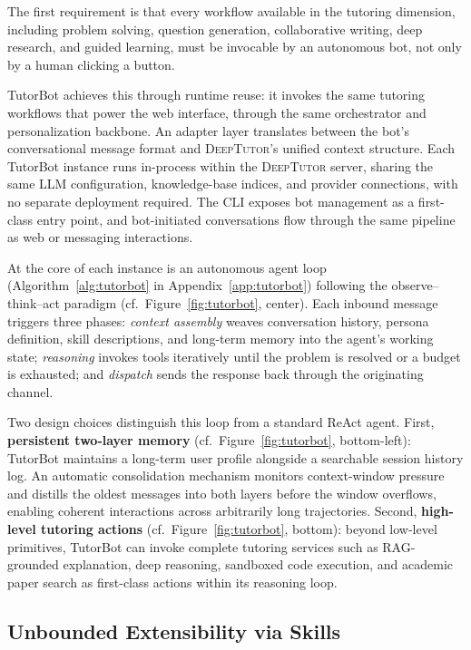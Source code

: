 The first requirement is that every workflow available in the tutoring dimension, including problem solving, question generation, collaborative writing, deep research, and guided learning, must be invocable by an autonomous bot, not only by a human clicking a button.

TutorBot achieves this through runtime reuse: it invokes the same tutoring workflows that power the web interface, through the same orchestrator and personalization backbone.
An adapter layer translates between the bot's conversational message format and \textsc{DeepTutor}'s unified context structure.
Each TutorBot instance runs in-process within the \textsc{DeepTutor} server, sharing the same LLM configuration, knowledge-base indices, and provider connections, with no separate deployment required.
The CLI exposes bot management as a first-class entry point, and bot-initiated conversations flow through the same pipeline as web or messaging interactions.

At the core of each instance is an autonomous agent loop (Algorithm~\ref{alg:tutorbot} in Appendix~\ref{app:tutorbot}) following the observe--think--act paradigm (cf.\ Figure~\ref{fig:tutorbot}, center).
Each inbound message triggers three phases: \emph{context assembly} weaves conversation history, persona definition, skill descriptions, and long-term memory into the agent's working state; \emph{reasoning} invokes tools iteratively until the problem is resolved or a budget is exhausted; and \emph{dispatch} sends the response back through the originating channel.

Two design choices distinguish this loop from a standard ReAct agent.
First, \textbf{persistent two-layer memory} (cf.\ Figure~\ref{fig:tutorbot}, bottom-left): TutorBot maintains a long-term user profile alongside a searchable session history log.
An automatic consolidation mechanism monitors context-window pressure and distills the oldest messages into both layers before the window overflows, enabling coherent interactions across arbitrarily long trajectories.
Second, \textbf{high-level tutoring actions} (cf.\ Figure~\ref{fig:tutorbot}, bottom): beyond low-level primitives, TutorBot can invoke complete tutoring services such as RAG-grounded explanation, deep reasoning, sandboxed code execution, and academic paper search as first-class actions within its reasoning loop.

\subsection{Unbounded Extensibility via Skills}
\label{sec:skills}

